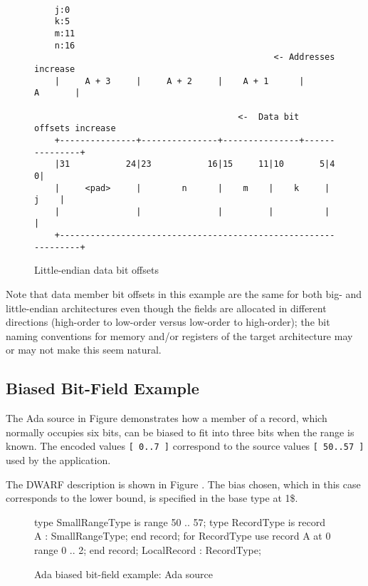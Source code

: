 \begin{figure}[ht]
\begin{dwflisting}
\begin{verbatim}

    j:0
    k:5
    m:11
    n:16
                                               <- Addresses increase
    |     A + 3     |     A + 2     |    A + 1      |       A       | 

                                        <-  Data bit offsets increase 
    +---------------+---------------+---------------+---------------+
    |31           24|23           16|15     11|10       5|4        0|
    |     <pad>     |        n      |    m    |    k     |     j    |
    |               |               |         |          |          |
    +---------------------------------------------------------------+

\end{verbatim}
\end{dwflisting}
\caption{Little-endian data bit offsets}
\label{fig:littleendiandatabitoffsets}
\end{figure}

Note that data member bit offsets in this example are the
same for both big- and little-endian architectures even
though the fields are allocated in different directions
(high-order to low-order versus low-order to high-order);
the bit naming conventions for memory and/or registers of
the target architecture may or may not make this seem natural.

\bb
\subsection{\Ada{} Biased Bit-Field Example}
The Ada source in Figure 
demonstrates how a member of a record, which
normally occupies six bits, can be biased to fit into three bits when the
range is known. The encoded values \texttt{[~0..7~]} correspond to the source
values \texttt{[~50..57~]} used by the application.

The DWARF description is shown in Figure .
The bias chosen, which in this case corresponds to the lower bound, is specified 
in the base type at 1\$.
\eb

\begin{figure}[ht]
\begin{nlnlisting}
type SmallRangeType is range 50 .. 57;
type RecordType is record 
   A : SmallRangeType;
end record;
for RecordType use record 
   A at 0 range 0 .. 2;
end record;
LocalRecord : RecordType;
\end{nlnlisting}
\caption{Ada biased bit-field example: Ada source}
\label{fig:adabiasedbitfieldexampleadasource}
\end{figure}

